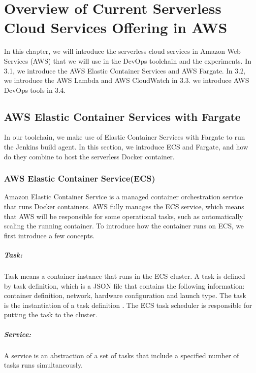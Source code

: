 \chapter{Overview of Current Serverless Cloud Services Offering in AWS}
In this chapter, we will introduce the serverless cloud services in Amazon Web Services (AWS) that we will use in the DevOps toolchain and the experiments.
 In 3.1, we introduce the AWS Elastic Container Services and AWS Fargate. In 3.2, we introduce the AWS Lambda and AWS CloudWatch in 3.3. we introduce AWS DevOps tools in 3.4.
\section{AWS Elastic Container Services with Fargate}
In our toolchain, we make use of Elastic Container Services with Fargate to run the Jenkins build agent. In this section, we introduce ECS and Fargate, and how do they combine to host the serverless Docker container.
\subsection{AWS Elastic Container Service(ECS)}
Amazon Elastic Container Service is a managed container orchestration service that runs Docker containers. AWS fully manages the ECS service, which means that AWS will be responsible for some operational tasks, such as automatically scaling the running container. To introduce how the container runs on ECS, we first introduce a few concepts.
\paragraph{Task:} Task means a container instance that runs in the ECS cluster. A task is defined by task definition, which is a JSON file that contains the following information: container definition, network, hardware configuration and launch type. The task is the instantiation of a task definition \cite{WhatisAm71:online}. The ECS task scheduler is responsible for putting the task to the cluster. 
\paragraph{Service:} A service is an abstraction of a set of tasks that include a specified number of tasks runs simultaneously.
